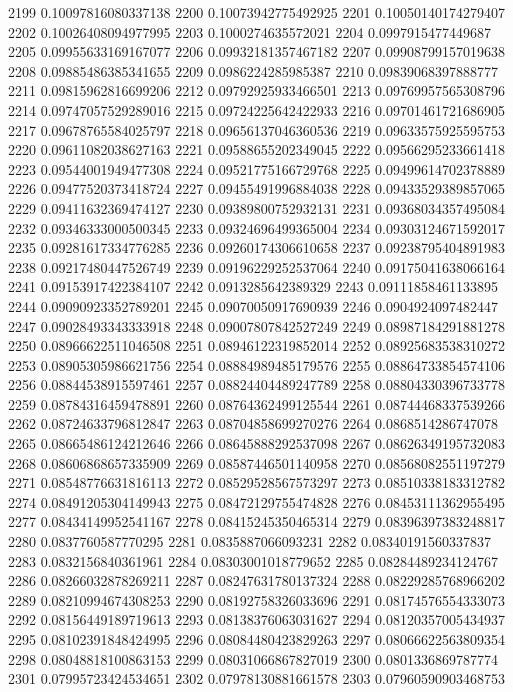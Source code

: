 2199 0.10097816080337138
2200 0.10073942775492925
2201 0.10050140174279407
2202 0.10026408094977995
2203 0.1000274635572021
2204 0.0997915477449687
2205 0.09955633169167077
2206 0.09932181357467182
2207 0.09908799157019638
2208 0.09885486385341655
2209 0.0986224285985387
2210 0.09839068397888777
2211 0.09815962816699206
2212 0.09792925933466501
2213 0.09769957565308796
2214 0.09747057529289016
2215 0.09724225642422933
2216 0.09701461721686905
2217 0.09678765584025797
2218 0.09656137046360536
2219 0.09633575925595753
2220 0.09611082038627163
2221 0.09588655202349045
2222 0.09566295233661418
2223 0.09544001949477308
2224 0.09521775166729768
2225 0.09499614702378889
2226 0.09477520373418724
2227 0.09455491996884038
2228 0.09433529389857065
2229 0.09411632369474127
2230 0.09389800752932131
2231 0.09368034357495084
2232 0.09346333000500345
2233 0.09324696499365004
2234 0.09303124671592017
2235 0.09281617334776285
2236 0.09260174306610658
2237 0.09238795404891983
2238 0.09217480447526749
2239 0.09196229252537064
2240 0.09175041638066164
2241 0.09153917422384107
2242 0.0913285642389329
2243 0.09111858461133895
2244 0.09090923352789201
2245 0.09070050917690939
2246 0.0904924097482447
2247 0.09028493343333918
2248 0.09007807842527249
2249 0.08987184291881278
2250 0.08966622511046508
2251 0.08946122319852014
2252 0.08925683538310272
2253 0.08905305986621756
2254 0.08884989485179576
2255 0.08864733854574106
2256 0.08844538915597461
2257 0.08824404489247789
2258 0.08804330396733778
2259 0.08784316459478891
2260 0.08764362499125544
2261 0.08744468337539266
2262 0.08724633796812847
2263 0.08704858699270276
2264 0.0868514286747078
2265 0.08665486124212646
2266 0.08645888292537098
2267 0.08626349195732083
2268 0.08606868657335909
2269 0.08587446501140958
2270 0.08568082551197279
2271 0.08548776631816113
2272 0.08529528567573297
2273 0.08510338183312782
2274 0.08491205304149943
2275 0.08472129755474828
2276 0.08453111362955495
2277 0.08434149952541167
2278 0.08415245350465314
2279 0.08396397383248817
2280 0.0837760587770295
2281 0.0835887066093231
2282 0.08340191560337837
2283 0.0832156840361961
2284 0.08303001018779652
2285 0.08284489234124767
2286 0.08266032878269211
2287 0.08247631780137324
2288 0.08229285768966202
2289 0.08210994674308253
2290 0.08192758326033696
2291 0.08174576554333073
2292 0.08156449189719613
2293 0.08138376063031627
2294 0.08120357005434937
2295 0.08102391848424995
2296 0.08084480423829263
2297 0.08066622563809354
2298 0.08048818100863153
2299 0.08031066867827019
2300 0.0801336869787774
2301 0.07995723424534651
2302 0.07978130881661578
2303 0.07960590903468753
